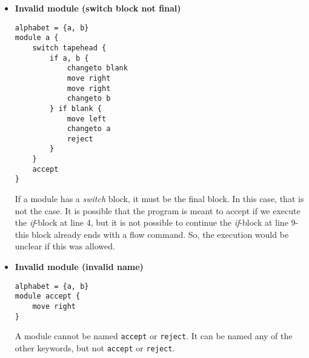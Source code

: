 \begin{itemize}
    \item \textbf{Invalid module (switch block not final)}
\begin{lstlisting}[language=TML]
alphabet = {a, b}
module a {
    switch tapehead {
        if a, b {
            changeto blank
            move right
            move right
            changeto b
        } if blank {
            move left
            changeto a
            reject
        }
    }
    accept
}
\end{lstlisting}
    If a module has a \textit{switch} block, it must be the final block. In this case, that is not the case. It is possible that the program is meant to accept if we execute the \textit{if}-block at line 4, but it is not possible to continue the \textit{if}-block at line 9- this block already ends with a flow command. So, the execution would be unclear if this was allowed.

    \item \textbf{Invalid module (invalid name)}
\begin{lstlisting}[language=TML]
alphabet = {a, b}
module accept {
    move right
}
\end{lstlisting}
    A module cannot be named \texttt{accept} or \texttt{reject}. It can be named any of the other keywords, but not \texttt{accept} or \texttt{reject}.

\end{itemize}
